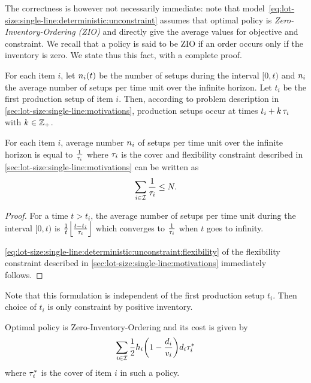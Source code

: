 The correctness is however not necessarily immediate: note that model~\eqref{eq:lot-size:single-line:deterministic:unconstraint} assumes that optimal policy is \emph{Zero-Inventory-Ordering (ZIO)} and directly give the average values for objective and constraint.
We recall that a policy is said to be ZIO if an order occurs only if the inventory is zero.
We state thus this fact, with a complete proof.


For each item $i$, let $\freq_i\bracket{t}$ be the number of setups during the interval $[0,t)$ and $n_i$ the average number of setups per time unit over the infinite horizon.
Let $t_i$ be the first production setup of item $i$.
Then, according to problem description in \cref{sec:lot-size:single-line:motivations}, production setups occur at times $t_i+k\,\tau_i$ with $k\in\mathbb{Z}_+$.


\begin{prop}\label{prop:lot-size:single-line:models:average-setup}
For each item $i$, average number $n_i$ of setups per time unit over the infinite horizon is equal to $\frac{1}{\tau_i}$ where $\tau_i$ is the cover and flexibility constraint described in \cref{sec:lot-size:single-line:motivations} can be written as
\begin{equation}
  \sum_{i\in\mathcal{I}} \frac{1}{\tau_i} \le N.
\end{equation}
\end{prop}


\begin{proof}
For a time $t>t_i$, the average number of setups per time unit during the interval $[0,t)$ is
$\frac{1}{t}\left\lfloor\frac{t-t_i}{\cover_i}\right\rfloor$
which converges to $\frac{1}{\tau_i}$ when $t$ goes to infinity.

\cref{eq:lot-size:single-line:deterministic:unconstraint:flexibility} of the flexibility constraint described in \cref{sec:lot-size:single-line:motivations} immediately follows.
\end{proof}


Note that this formulation is independent of the first production setup $t_i$.
Then choice of $t_i$ is only constraint by positive inventory.


\begin{prop}\label{prop:lot-size:single-line:models:ZIO}
Optimal policy is Zero-Inventory-Ordering and its cost is given by
\begin{equation}
  \sum_{i\in\REF}\frac{1}{2}\holding_i\bracket{1-\frac{\demand_i}{\rate_i}}\demand_i\cover_i^*
\end{equation}
where $\tau_i^*$ is the cover of item $i$ in such a policy.
\end{prop}


